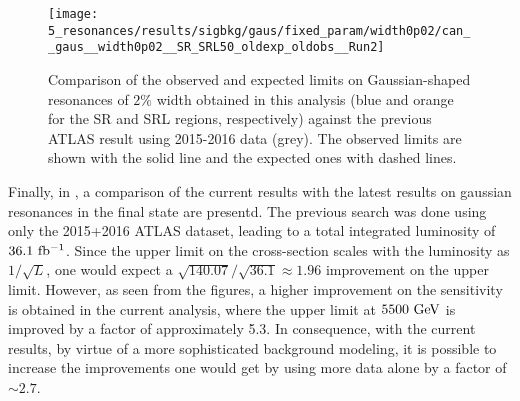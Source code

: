 \begin{figure}[ht!]
    \centering
    \texttt{[image: 5\_resonances/results/sigbkg/gaus/fixed\_param/width0p02/can\_\_gaus\_\_width0p02\_\_SR\_SRL50\_oldexp\_oldobs\_\_Run2]}
    \caption{Comparison of the observed and expected limits on Gaussian-shaped resonances of \(2\%\) width obtained in this analysis (blue and orange for the SR and SRL regions, respectively) against the previous \ac{ATLAS} result using 2015-2016 data (grey). The observed limits are shown with the solid line and the expected ones with dashed lines.}
    \label{fig:results:results:bkgsig:results:gaus:limits_comparison_old}
\end{figure}


Finally, in \Fig{\ref{fig:results:results:bkgsig:results:gaus:limits_comparison_old}}, a comparison of the current results with the latest results on gaussian resonances in the \gammajet final state are presentd. The previous search was done using only the 2015+2016 \ac{ATLAS} dataset, leading to a total integrated luminosity of \(36.1~\ifb\). Since the upper limit on the cross-section scales with the luminosity as \(1 / \sqrt{L}\), one would expect a \(\sqrt{140.07} / \sqrt{36.1} \approx 1.96\) improvement on the upper limit. However, as seen from the figures, a higher improvement on the sensitivity is obtained in the current analysis, where the upper limit at \(5500~\gev\) is improved by a factor of approximately 5.3. In consequence, with the current results, by virtue of a more sophisticated background modeling, it is possible to increase the improvements one would get by using more data alone by a factor of \(\sim 2.7\).







